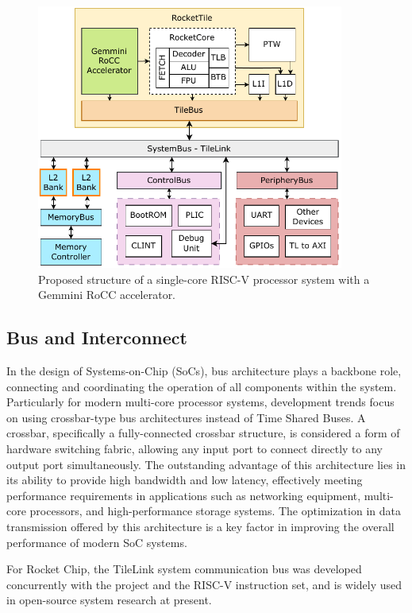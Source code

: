 \begin{figure}[h!]
    \centering
    \includegraphics[width=0.9\textwidth]{Images/RocketChip_Gemmini_Diagram.pdf}
    \caption{Proposed structure of a single-core RISC-V processor system with a Gemmini RoCC accelerator.}
    \label{fig:single_core_gemmini_system}
\end{figure}

\subsection{Bus and Interconnect}
\label{subsec:bus_interconnect}

In the design of Systems-on-Chip (SoCs), bus architecture plays a backbone role, connecting and coordinating the operation of all components within the system. Particularly for modern multi-core processor systems, development trends focus on using crossbar-type bus architectures instead of Time Shared Buses. A crossbar, specifically a fully-connected crossbar structure, is considered a form of hardware switching fabric, allowing any input port to connect directly to any output port simultaneously. The outstanding advantage of this architecture lies in its ability to provide high bandwidth and low latency, effectively meeting performance requirements in applications such as networking equipment, multi-core processors, and high-performance storage systems. The optimization in data transmission offered by this architecture is a key factor in improving the overall performance of modern SoC systems.

For Rocket Chip, the TileLink \cite{sifive2018tilelink} system communication bus was developed concurrently with the project and the RISC-V instruction set, and is widely used in open-source system research at present.

